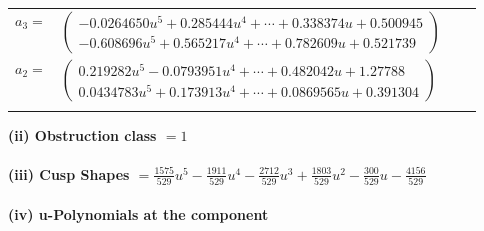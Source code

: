 \documentclass[1p]{elsarticle_modified}
\theoremstyle{definition}
\begin{document}
\begin{tabular}{m{7pt} m{180pt} m{7pt} m{180pt} }
\flushright $a_{3}=$&$\begin{pmatrix}-0.0264650 u^{5}+0.285444 u^{4}+\cdots+0.338374 u+0.500945\\-0.608696 u^{5}+0.565217 u^{4}+\cdots+0.782609 u+0.521739\end{pmatrix}$ \\
\flushright $a_{2}=$&$\begin{pmatrix}0.219282 u^{5}-0.0793951 u^{4}+\cdots+0.482042 u+1.27788\\0.0434783 u^{5}+0.173913 u^{4}+\cdots+0.0869565 u+0.391304\end{pmatrix}$\\&\end{tabular}
\flushleft \textbf{(ii) Obstruction class $= 1$}\\~\\
\flushleft \textbf{(iii) Cusp Shapes $= \frac{1575}{529} u^5-\frac{1911}{529} u^4-\frac{2712}{529} u^3+\frac{1803}{529} u^2-\frac{300}{529} u-\frac{4156}{529}$}\\~\\
\newpage\renewcommand{\arraystretch}{1}
\flushleft \textbf{(iv) u-Polynomials at the component}\newline \\
\end{document}
